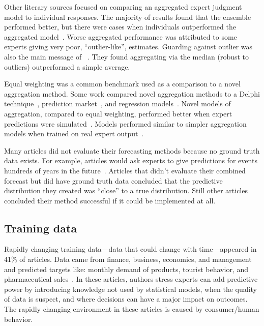\documentclass[preprint,authoryear,nonatbib]{elsarticle}
\begin{document}
Other literary sources focused on comparing an aggregated expert judgment model to individual responses.
The majority of results found that the ensemble performed better, but there were cases when individuals outperformed the aggregated model~\parencite{morales2017characterization}.
Worse aggregated performance was attributed to some experts giving very poor, ``outlier-like'', estimates.
Guarding against outlier was also the main message of ~\parencite{hora2013median}.
They found aggregating via the median (robust to outliers) outperformed a simple average.

Equal weighting was a common benchmark used as a comparison to a novel aggregation method.
Some work compared novel aggregation methods to a Delphi technique~\parencite{cai2016simple}, prediction market~\parencite{graefe2014accuracy,graefe2018predicting,graefe2014combining}, and regression models~\parencite{mak1996aggregating}.
Novel models of aggregation, compared to equal weighting, performed better when expert predictions were simulated~\parencite{hurley2002combining,bolger2017deriving,baldwin2015weighting,hora2013median}.
Models performed similar to simpler aggregation models when trained on real expert output~\parencite{mak1996aggregating,petrovic2006fuzzy,graefe2014accuracy,morales2017characterization,cai2016simple,hanea2018value,huang2016improving,graefe2015accuracy,satopaa2014probability,graefe2018predicting,alho1992estimating,jana2019interval,ren2002optimal,baecke2017investigating,seifert2013relative,graefe2014combining,alvarado2017expertise,franses2011averaging,craig2001bayesian}.

Many articles did not evaluate their forecasting methods because no ground truth data exists.
For example, articles would ask experts to give predictions for events hundreds of years in the future~\parencite{zio1997accounting,zio1996use}.
Articles that didn't evaluate their combined forecast but did have ground truth data concluded that the predictive distribution they created was ``close'' to a true distribution.
Still other articles concluded their method successful if it could be implemented at all.

\subsection{Training data}
Rapidly changing training data---data that could change with time---appeared in 41\% of articles.
Data came from finance, business, economics, and management and predicted targets like: monthly demand of products, tourist behavior, and pharmaceutical sales~\parencite{baecke2017investigating,petrovic2006fuzzy,wang2008probabilistic,klas2010support,franses2011averaging}.
In these articles, authors stress experts can add predictive power by introducing knowledge not used by statistical models, when the quality of data is suspect, and where decisions can have a major impact on outcomes. 
The rapidly changing environment in these articles is caused by consumer/human behavior.
\end{document}
